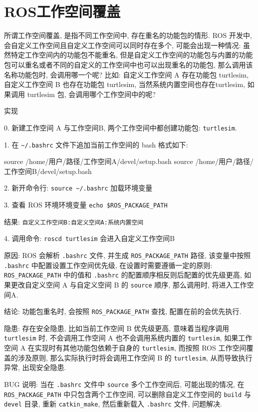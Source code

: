 \documentclass[openany, fontset=windowsold]{ctexbook}
\theoremstyle{kaiti}
\theoremstyle{normal}
\begin{document}
\section{ROS工作空间覆盖}

所谓工作空间覆盖, 是指不同工作空间中, 存在重名的功能包的情形. ROS 开发中, 会自定义工作空间且自定义工作空间可以同时存在多个, 可能会出现一种情况: 虽然特定工作空间内的功能包不能重名, 但是自定义工作空间的功能包与内置的功能包可以重名或者不同的自定义的工作空间中也可以出现重名的功能包, 那么调用该名称功能包时, 会调用哪一个呢? 比如: 自定义工作空间 A 存在功能包 turtlesim, 自定义工作空间 B 也存在功能包 turtlesim, 当然系统内置空间也存在turtlesim, 如果调用 turtlesim 包, 会调用哪个工作空间中的呢? 

实现

0. 新建工作空间 A 与工作空间B, 两个工作空间中都创建功能包: \verb|turtlesim|.

1. 在 \verb|~/.bashrc| 文件下追加当前工作空间的 bash 格式如下:

\begin{bash}
  source /home/用户/路径/工作空间A/devel/setup.bash
  source /home/用户/路径/工作空间B/devel/setup.bash
\end{bash}

2. 新开命令行: \verb|source ~/.bashrc| 加载环境变量

3. 查看 ROS 环境环境变量 \verb|echo $ROS_PACKAGE_PATH|

结果: \verb|自定义工作空间B:自定义空间A:系统内置空间|

4. 调用命令: \verb|roscd turtlesim| 会进入自定义工作空间B

原因: ROS 会解析 \verb|.bashrc| 文件, 并生成 \verb|ROS_PACKAGE_PATH| 路径, 该变量中按照 \verb|.bashrc| 中配置设置工作空间优先级, 在设置时需要遵循一定的原则: \verb|ROS_PACKAGE_PATH| 中的值和 \verb|.bashrc| 的配置顺序相反则后配置的优先级更高, 如果更改自定义空间 A 与自定义空间 B 的 \verb|source| 顺序, 那么调用时, 将进入工作空间A.

结论: 功能包重名时, 会按照 \verb|ROS_PACKAGE_PATH| 查找, 配置在前的会优先执行.

隐患: 存在安全隐患, 比如当前工作空间 B 优先级更高, 意味着当程序调用 \verb|turtlesim| 时, 不会调用工作空间 A 也不会调用系统内置的 \verb|turtlesim|, 如果工作空间 A 在实现时有其他功能包依赖于自身的 \verb|turtlesim|, 而按照 ROS 工作空间覆盖的涉及原则, 那么实际执行时将会调用工作空间 B 的 \verb|turtlesim|, 从而导致执行异常, 出现安全隐患.

BUG 说明: 当在 \verb|.bashrc| 文件中 \verb|source| 多个工作空间后, 可能出现的情况, 在 \verb|ROS_PACKAGE_PATH| 中只包含两个工作空间, 可以删除自定义工作空间的 \verb|build| 与 \verb|devel| 目录, 重新 \verb|catkin_make|, 然后重新载入 \verb|.bashrc| 文件, 问题解决.
\end{document}
